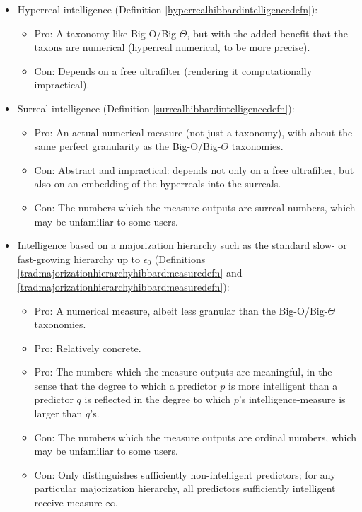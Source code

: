 \documentclass{article}
\begin{document}
\begin{itemize}
\begin{itemize}
    \end{itemize}
    \item
    Hyperreal intelligence (Definition \ref{hyperrealhibbardintelligencedefn}):
    \begin{itemize}
        \item
        Pro: A taxonomy like Big-O/Big-$\Theta$, but with the added benefit
        that the taxons are numerical (hyperreal numerical, to be more precise).
        \item
        Con: Depends on a free ultrafilter (rendering it
        computationally impractical).
    \end{itemize}
    \item
    Surreal intelligence (Definition \ref{surrealhibbardintelligencedefn}):
    \begin{itemize}
        \item
        Pro: An actual numerical measure (not just a taxonomy), with about the same perfect
        granularity as the Big-O/Big-$\Theta$ taxonomies.
        \item
        Con: Abstract and impractical: depends not only on
        a free ultrafilter, but also on an embedding of the hyperreals into the surreals.
        \item
        Con: The numbers which the measure outputs are surreal numbers, which may be
        unfamiliar to some users.
    \end{itemize}
    \item
    Intelligence based on a majorization hierarchy such as the
    standard slow- or fast-growing hierarchy up to $\epsilon_0$
    (Definitions \ref{tradmajorizationhierarchyhibbardmeasuredefn}
    and \ref{tradmajorizationhierarchyhibbardmeasuredefn}):
    \begin{itemize}
        \item
        Pro: A numerical measure, albeit less granular than the
        Big-O/Big-$\Theta$ taxonomies.
        \item
        Pro: Relatively concrete.
        \item
        Pro: The numbers which the measure outputs are meaningful, in the sense that
        the degree to which a predictor $p$ is more intelligent than a
        predictor $q$ is reflected
        in the degree to which $p$'s intelligence-measure is larger than $q$'s.
        \item
        Con: The numbers which the measure outputs are ordinal numbers, which may be
        unfamiliar to some users.
        \item
        Con: Only distinguishes sufficiently non-intelligent predictors; for any particular
        majorization hierarchy, all predictors
        sufficiently intelligent receive measure $\infty$.
    \end{itemize}
\end{itemize}
\end{document}
